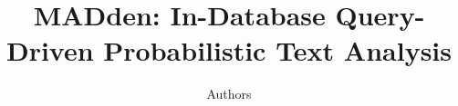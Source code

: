 \documentclass{acm_proc_article-sp}
\newcommand{\system}{MADden}
\begin{document}
\title{\system: In-Database Query-Driven Probabilistic Text Analysis}

\author{Authors}

\maketitle













%




\end{document}
